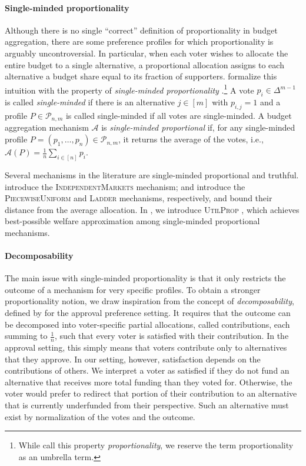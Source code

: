 \documentclass[11pt]{article}
\newcommand{\A}{\mathcal{A}}
\newcommand{\IM}{\textsc{IndependentMarkets} }
\newcommand{\Ladder}{\textsc{Ladder} }
\newcommand{\PiecewiseUniform}{\textsc{PiecewiseUniform} }
\newcommand{\UtP}{\textsc{UtilProp} }
\newcommand{\smp}{single-minded proportionality }
\begin{document}
\paragraph{Single-minded proportionality} 
{Although there is no single “correct” definition of proportionality in budget aggregation, there are some preference profiles for which proportionality is arguably uncontroversial. In particular, when each voter wishes to allocate the entire budget to a single alternative, a proportional allocation assigns to each alternative a budget share equal to its fraction of supporters. \citet{freeman2021truthful} formalize this intuition with the property of \emph{\smp}.}\footnote{While \citet{freeman2021truthful} call this property \textit{proportionality}, we reserve the term proportionality as an umbrella term.}
A vote $p_i \in \Delta^{m-1}$ is called \textit{single-minded} if there is an alternative $j \in [m]$ with $p_{i,j} = 1$ and a profile $P \in \mathcal{P}_{n,m}$ is called single-minded if all votes are single-minded.
A budget aggregation mechanism $\A$ is \textit{single-minded proportional} if, for any single-minded profile $P=(p_1, \dots, p_n) \in \mathcal{P}_{n,m}$, it returns the average of the votes, i.e., $\A(P) = \frac{1}{n} \sum_{i \in [n]} p_i$.


Several mechanisms in the literature are single-minded proportional and truthful. \citet{freeman2021truthful} introduce the \IM mechanism; 
\citet{caragiannis2022truthful} and \citet{freeman2024project} introduce the \PiecewiseUniform and \Ladder mechanisms, respectively, and bound their distance from the average allocation. 
In , we introduce \UtP, which achieves best-possible welfare approximation among single-minded proportional mechanisms. 



\paragraph{Decomposability}
The main issue with 
single-minded proportionality is that it only restricts the outcome of a mechanism for very specific profiles.
To obtain a stronger proportionality notion, 
we draw inspiration from the concept of \textit{decomposability}, defined by \citet{brandl2021distribution} for the approval preference setting.
It requires that the outcome can be decomposed into voter-specific partial allocations, called contributions, each summing to $\tfrac{1}{n}$, such that every voter is satisfied with their contribution. In the approval setting, this simply means that voters contribute only to alternatives that they approve. In our setting, however, satisfaction depends on the contributions of others. We interpret a voter as satisfied if they do not fund an alternative that receives more total funding than they voted for. Otherwise, the voter would prefer to redirect that portion of their contribution to an alternative that is currently underfunded from their perspective. Such an alternative must exist by normalization of the votes and the outcome.
\end{document}
